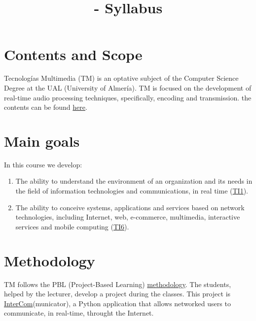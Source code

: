 

\title{\TM{} - Syllabus}

\maketitle

\section{Contents and Scope}

Tecnologías Multimedia (TM) is an optative subject of the Computer
Science Degree at the UAL (University of Almería). TM is focused on
the development of real-time audio processing techniques,
specifically, encoding and transmission. the contents can be found
\href{https://tecnologias-multimedia.github.io/contents/}{here}.

\section{Main goals}

In this course we develop:
\begin{enumerate}
\item The ability to understand the environment of an organization and
  its needs in the field of information technologies and
  communications, in real time
  (\href{https://www.ual.es/application/files/8516/5061/5446/memoriavig-ing-informatica-4015.pdf}{TI1}).
\item The ability to conceive systems, applications and services based
  on network technologies, including Internet, web, e-commerce,
  multimedia, interactive services and mobile computing
  (\href{https://www.ual.es/application/files/8516/5061/5446/memoriavig-ing-informatica-4015.pdf}{TI6}).
\end{enumerate}

\section{Methodology}

TM follows the PBL (Project-Based Learning)
\href{http://portafirma.ual.es/pfirma/downloadReport/file?idDocument=4u61Ie5es2&idRequest=ZeBY35LlFa}{methodology}. The
students, helped by the lecturer, develop a project during the
classes. This project is
\href{https://github.com/Tecnologias-multimedia/intercom}{InterCom}(municator),
a Python application that allows networked users to communicate, in
real-time, throught the Internet.

